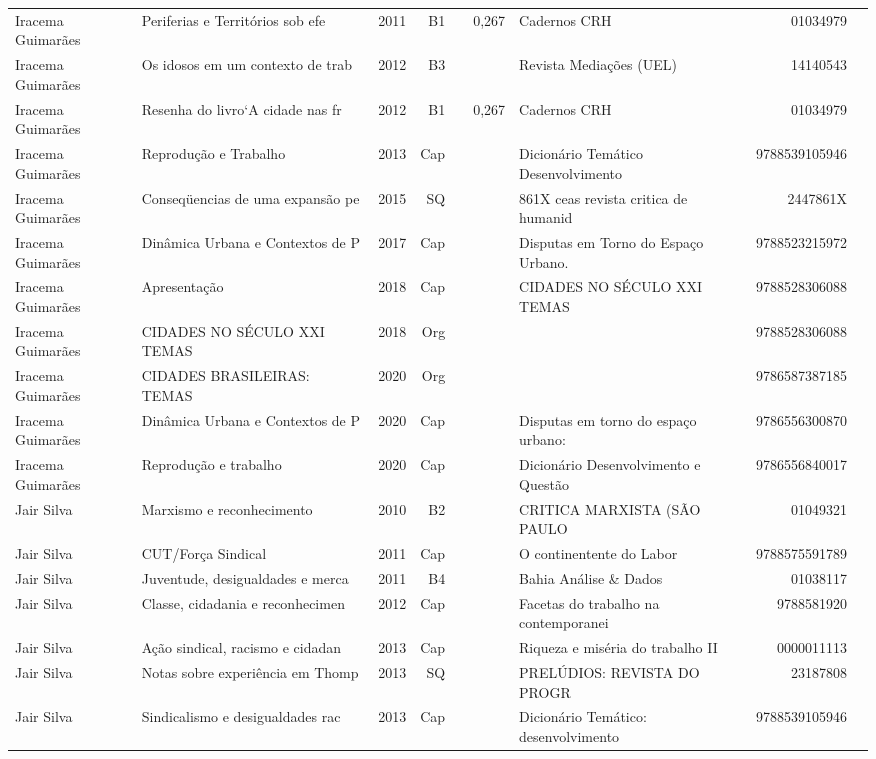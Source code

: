 \documentclass[12pt,brazil]{article}\usepackage[]{graphicx}\usepackage[]{xcolor}
\begin{document}
\begin{longtable}{lllrrllrr}
Iracema Guimarães & Periferias e Territórios sob efe & 2011 & B1 &  & 0,267 & Cadernos CRH & 01034979 \\
Iracema Guimarães & Os idosos em um contexto de trab & 2012 & B3 &  &  & Revista Mediações (UEL) & 14140543 \\
Iracema Guimarães & Resenha do livro‘A cidade nas fr & 2012 & B1 &  & 0,267 & Cadernos CRH & 01034979 \\
Iracema Guimarães & Reprodução e Trabalho & 2013 & Cap &  &  & Dicionário Temático Desenvolvimento  & 9788539105946 \\
Iracema Guimarães & Conseqüencias de uma expansão pe & 2015 & SQ &  &  & 861X ceas revista critica de humanid & 2447861X \\
Iracema Guimarães & Dinâmica Urbana e Contextos de P & 2017 & Cap &  &  & Disputas em Torno do Espaço Urbano.  & 9788523215972 \\
Iracema Guimarães & Apresentação & 2018 & Cap &  &  & CIDADES NO SÉCULO XXI TEMAS & 9788528306088 \\
Iracema Guimarães & CIDADES NO SÉCULO XXI TEMAS & 2018 & Org &  &  &  & 9788528306088 \\
Iracema Guimarães & CIDADES BRASILEIRAS: TEMAS  & 2020 & Org &  &  &  & 9786587387185 \\
\rowcolor{duplic}Iracema Guimarães & Dinâmica Urbana e Contextos de P & 2020 & Cap &  &  & Disputas em torno do espaço urbano:  & 9786556300870 \\
\rowcolor{duplic}Iracema Guimarães & Reprodução e trabalho & 2020 & Cap &  &  & Dicionário Desenvolvimento e Questão & 9786556840017 \\
Jair Silva & Marxismo e reconhecimento & 2010 & B2 &  &  & CRITICA MARXISTA (SÃO PAULO & 01049321 \\
Jair Silva & CUT/Força Sindical & 2011 & Cap &  &  & O continentente do Labor & 9788575591789 \\
Jair Silva & Juventude, desigualdades e merca & 2011 & B4 &  &  & Bahia Análise \& Dados & 01038117 \\
Jair Silva & Classe, cidadania e reconhecimen & 2012 & Cap &  &  & Facetas do trabalho na contemporanei & 9788581920 \\
Jair Silva & Ação sindical, racismo e cidadan & 2013 & Cap &  &  & Riqueza e miséria do trabalho II & 0000011113 \\
Jair Silva & Notas sobre experiência em Thomp & 2013 & SQ &  &  & PRELÚDIOS: REVISTA DO PROGR & 23187808 \\
Jair Silva & Sindicalismo e desigualdades rac & 2013 & Cap &  &  & Dicionário Temático: desenvolvimento & 9788539105946 \\

\end{longtable}
\end{document}
